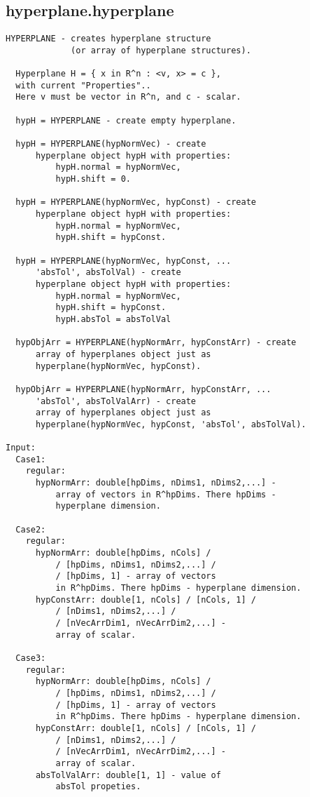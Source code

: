 \subsection{\texorpdfstring{hyperplane.hyperplane}{hyperplane}}\label{method:hyperplane.hyperplane}
\begin{verbatim}
HYPERPLANE - creates hyperplane structure
             (or array of hyperplane structures).

  Hyperplane H = { x in R^n : <v, x> = c },
  with current "Properties"..
  Here v must be vector in R^n, and c - scalar.

  hypH = HYPERPLANE - create empty hyperplane.

  hypH = HYPERPLANE(hypNormVec) - create
      hyperplane object hypH with properties:
          hypH.normal = hypNormVec,
          hypH.shift = 0.

  hypH = HYPERPLANE(hypNormVec, hypConst) - create
      hyperplane object hypH with properties:
          hypH.normal = hypNormVec,
          hypH.shift = hypConst.

  hypH = HYPERPLANE(hypNormVec, hypConst, ...
      'absTol', absTolVal) - create
      hyperplane object hypH with properties:
          hypH.normal = hypNormVec,
          hypH.shift = hypConst.
          hypH.absTol = absTolVal

  hypObjArr = HYPERPLANE(hypNormArr, hypConstArr) - create
      array of hyperplanes object just as
      hyperplane(hypNormVec, hypConst).

  hypObjArr = HYPERPLANE(hypNormArr, hypConstArr, ...
      'absTol', absTolValArr) - create
      array of hyperplanes object just as
      hyperplane(hypNormVec, hypConst, 'absTol', absTolVal).

Input:
  Case1:
    regular:
      hypNormArr: double[hpDims, nDims1, nDims2,...] -
          array of vectors in R^hpDims. There hpDims -
          hyperplane dimension.

  Case2:
    regular:
      hypNormArr: double[hpDims, nCols] /
          / [hpDims, nDims1, nDims2,...] /
          / [hpDims, 1] - array of vectors
          in R^hpDims. There hpDims - hyperplane dimension.
      hypConstArr: double[1, nCols] / [nCols, 1] /
          / [nDims1, nDims2,...] /
          / [nVecArrDim1, nVecArrDim2,...] -
          array of scalar.

  Case3:
    regular:
      hypNormArr: double[hpDims, nCols] /
          / [hpDims, nDims1, nDims2,...] /
          / [hpDims, 1] - array of vectors
          in R^hpDims. There hpDims - hyperplane dimension.
      hypConstArr: double[1, nCols] / [nCols, 1] /
          / [nDims1, nDims2,...] /
          / [nVecArrDim1, nVecArrDim2,...] -
          array of scalar.
      absTolValArr: double[1, 1] - value of
          absTol propeties.


\end{verbatim}
